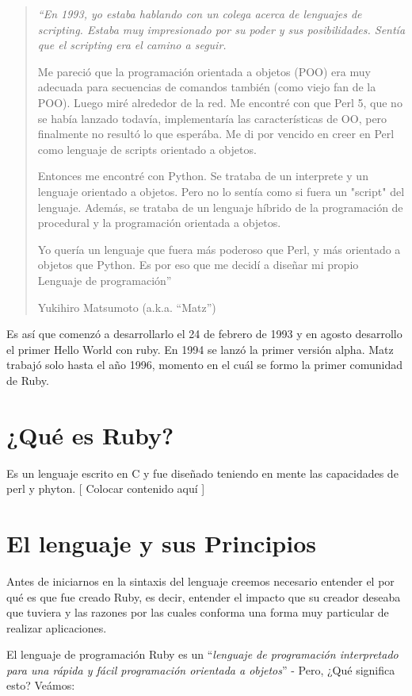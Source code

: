 \documentclass{article}
\begin{document}
\begin{quotation}
\em``En 1993, yo estaba hablando con un colega acerca de lenguajes de scripting. Estaba muy impresionado por su poder y sus posibilidades. Sentía que el scripting era el camino a seguir.
	\par
	Me pareció que la programación orientada a objetos (POO) era muy adecuada para secuencias de comandos también (como viejo fan de la POO). Luego miré alrededor de la red. Me encontré con que Perl 5, que no se había lanzado todavía, implementaría las características de OO, pero  finalmente no resultó lo que esperába. Me di por vencido en creer en Perl como lenguaje de scripts orientado a objetos.
	\par
	Entonces me encontré con Python. Se trataba de un interprete y un lenguaje orientado a objetos. Pero no lo sentía como si fuera un "script" del lenguaje. Además, se trataba de un lenguaje híbrido de la programación de procedural y la programación orientada a objetos.
	\par
	Yo quería un lenguaje que fuera más poderoso que Perl, y más orientado a objetos que Python. Es por eso que me decidí a diseñar mi propio Lenguaje de programación''
\begin{flushright} Yukihiro Matsumoto (a.k.a. “Matz”)\end{flushright}
\end{quotation}  

Es así que comenzó a desarrollarlo el 24 de febrero de 1993 y en agosto desarrollo el primer Hello World con ruby. En 1994 se lanzó la primer versión alpha. Matz trabajó solo hasta el año 1996, momento en el cuál se formo la primer comunidad de Ruby.




\section{¿Qué es Ruby?}

	Es un lenguaje escrito en C y fue diseñado teniendo en mente las capacidades de perl y phyton. [ Colocar contenido aquí ]




\section{El lenguaje y sus Principios}
	
	Antes de iniciarnos en la sintaxis del lenguaje creemos necesario entender el por qué es que fue creado Ruby, es decir, entender el impacto que su creador deseaba que tuviera y las razones por las cuales conforma una forma muy particular de realizar aplicaciones.
	\par
	El lenguaje de programación Ruby es un ``\emph{lenguaje de programación interpretado para una rápida y fácil programación orientada a objetos}'' - Pero, ¿Qué significa esto? Veámos:
\bigskip\\
\end{document}
